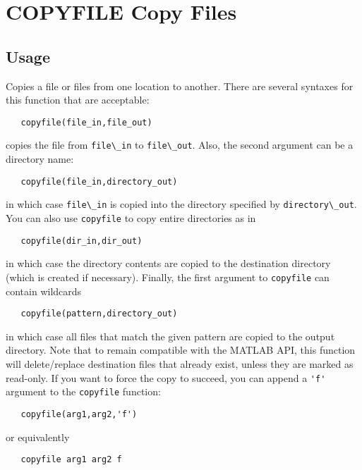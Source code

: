\section{COPYFILE Copy Files}

\subsection{Usage}

Copies a file or files from one location to another.  There are 
several syntaxes for this function that are acceptable:
\begin{verbatim}
   copyfile(file_in,file_out)
\end{verbatim}
copies the file from \verb|file\_in| to \verb|file\_out|.  Also, the second
argument can be a directory name:
\begin{verbatim}
   copyfile(file_in,directory_out)
\end{verbatim}
in which case \verb|file\_in| is copied into the directory specified by
\verb|directory\_out|.  You can also use \verb|copyfile| to copy entire directories
as in
\begin{verbatim}
   copyfile(dir_in,dir_out)
\end{verbatim}
in which case the directory contents are copied to the destination directory
(which is created if necessary).  Finally, the first argument to \verb|copyfile| can
contain wildcards
\begin{verbatim}
   copyfile(pattern,directory_out)
\end{verbatim}
in which case all files that match the given pattern are copied to the output
directory.   Note that to remain compatible with the MATLAB API, this function
will delete/replace destination files that already exist, unless they are marked
as read-only.  If you want to force the copy to succeed, you can append a \verb|'f'|
argument to the \verb|copyfile| function:
\begin{verbatim}
   copyfile(arg1,arg2,'f')
\end{verbatim}
or equivalently
\begin{verbatim}
   copyfile arg1 arg2 f
\end{verbatim}
